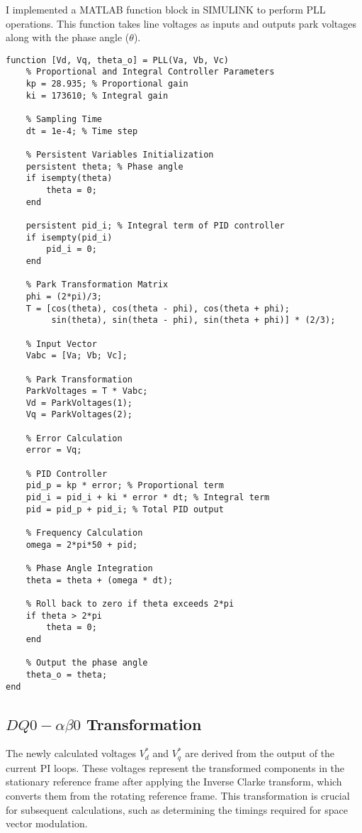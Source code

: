 I implemented a MATLAB function block in SIMULINK to perform PLL operations.
This function takes line voltages as inputs and outputs park voltages along
with the phase angle ($\theta$).\\

\begin{lstlisting}[style=MATLAB, caption={Three-Phase Phase-Locked Loop}, label={lst:matlab}]
    function [Vd, Vq, theta_o] = PLL(Va, Vb, Vc)
    % Proportional and Integral Controller Parameters
    kp = 28.935; % Proportional gain
    ki = 173610; % Integral gain
    
    % Sampling Time
    dt = 1e-4; % Time step
    
    % Persistent Variables Initialization
    persistent theta; % Phase angle
    if isempty(theta)
        theta = 0;
    end
    
    persistent pid_i; % Integral term of PID controller
    if isempty(pid_i)
        pid_i = 0;
    end
    
    % Park Transformation Matrix
    phi = (2*pi)/3;
    T = [cos(theta), cos(theta - phi), cos(theta + phi);
         sin(theta), sin(theta - phi), sin(theta + phi)] * (2/3);
     
    % Input Vector
    Vabc = [Va; Vb; Vc];
    
    % Park Transformation
    ParkVoltages = T * Vabc;
    Vd = ParkVoltages(1);
    Vq = ParkVoltages(2);
    
    % Error Calculation
    error = Vq;
    
    % PID Controller
    pid_p = kp * error; % Proportional term
    pid_i = pid_i + ki * error * dt; % Integral term
    pid = pid_p + pid_i; % Total PID output
    
    % Frequency Calculation
    omega = 2*pi*50 + pid;
    
    % Phase Angle Integration
    theta = theta + (omega * dt);
    
    % Roll back to zero if theta exceeds 2*pi
    if theta > 2*pi
        theta = 0;
    end
    
    % Output the phase angle
    theta_o = theta;
end
\end{lstlisting}

\subsection{$DQ0-\alpha\beta0$ Transformation}
The newly calculated voltages \( V_d^* \) and \( V_q^* \) are derived from the
output of the current PI loops. These voltages represent the transformed
components in the stationary reference frame after applying the Inverse Clarke
transform, which converts them from the rotating reference frame. This
transformation is crucial for subsequent calculations, such as determining the
timings required for space vector modulation.\\

